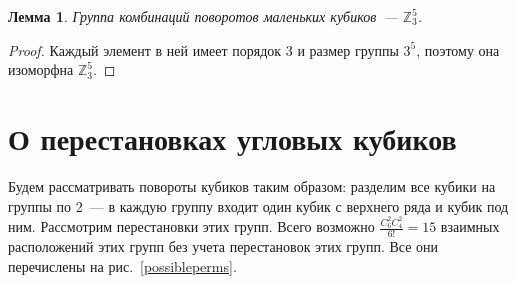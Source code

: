 \documentclass[utf8,a4paper,draft]{article}
\newtheorem{lemma_cub}{Лемма}[section]
\begin{document}
\begin{lemma_cub}
Группа комбинаций поворотов маленьких кубиков~--- $\mathbb{Z}_3^5$.
\end{lemma_cub}
\begin{proof}
    Каждый элемент в ней имеет порядок 3 и размер группы $3^5$, поэтому она изоморфна $\mathbb{Z}_3^5$.
\end{proof}
\section{О перестановках угловых кубиков}
Будем рассматривать повороты кубиков таким образом: разделим все кубики на группы по 2~--- в каждую группу входит один кубик с верхнего ряда и кубик под ним. Рассмотрим перестановки этих групп. Всего возможно $\frac{C^2_6C^2_4}{6!}=15$ взаимных расположений этих групп без учета перестановок этих групп. Все они перечислены на рис.~\ref{possibleperms}.
\end{document}
